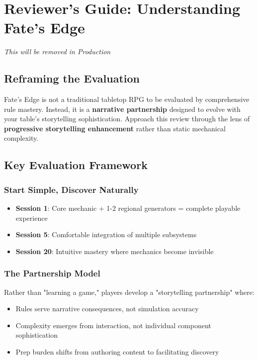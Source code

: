 \section{Reviewer's Guide: Understanding Fate's Edge}

\textit{This will be removed in Production}

\subsection{Reframing the Evaluation}

Fate's Edge is not a traditional tabletop RPG to be evaluated by comprehensive rule mastery. Instead, it is a \textbf{narrative partnership} designed to evolve with your table's storytelling sophistication. Approach this review through the lens of \textbf{progressive storytelling enhancement} rather than static mechanical complexity.

\subsection{Key Evaluation Framework}

\subsubsection{Start Simple, Discover Naturally}
\begin{itemize}
    \item \textbf{Session 1}: Core mechanic + 1-2 regional generators = complete playable experience
    \item \textbf{Session 5}: Comfortable integration of multiple subsystems
    \item \textbf{Session 20}: Intuitive mastery where mechanics become invisible
\end{itemize}

\subsubsection{The Partnership Model}
Rather than "learning a game," players develop a "storytelling partnership" where:
\begin{itemize}
    \item Rules serve narrative consequences, not simulation accuracy
    \item Complexity emerges from interaction, not individual component sophistication  
    \item Prep burden shifts from authoring content to facilitating discovery
\end{itemize}

